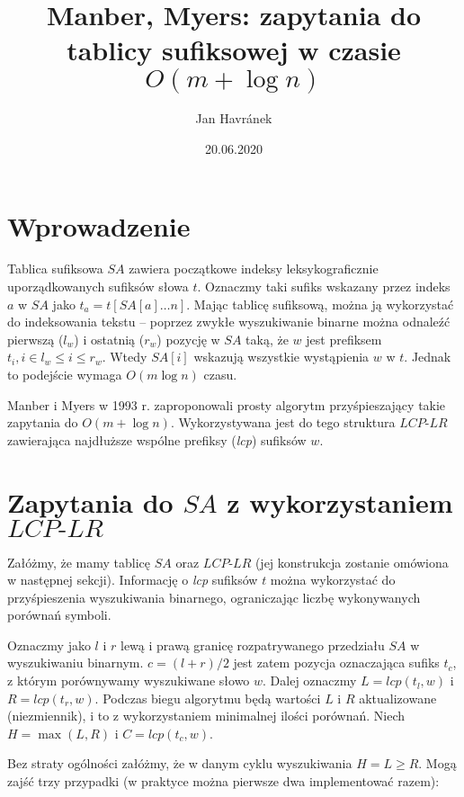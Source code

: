 \documentclass[12pt]{article}
\title{Manber, Myers: zapytania do tablicy sufiksowej w czasie $O(m + \log{n})$}
\author{Jan Havránek}
\date{20.06.2020}
\begin{document}
\maketitle

\section*{Wprowadzenie}
Tablica sufiksowa $SA$ zawiera początkowe indeksy leksykograficznie uporządkowanych sufiksów słowa $t$. Oznaczmy taki sufiks wskazany przez indeks $a$ w $SA$ jako $t_a = t[SA[a]\ldots n]$. Mając tablicę sufiksową, można ją wykorzystać do indeksowania tekstu -- poprzez zwykłe wyszukiwanie binarne można odnaleźć pierwszą ($l_w$) i ostatnią ($r_w$) pozycję w $SA$ taką, że $w$ jest prefiksem $t_i, i \in l_w \leq i \leq r_w$. Wtedy $SA[i]$ wskazują wszystkie wystąpienia $w$ w $t$. Jednak to podejście wymaga $O(m \log{n})$ czasu.

Manber i Myers w 1993 r. zaproponowali prosty algorytm przyśpieszający takie zapytania do $O(m + \log{n})$. Wykorzystywana jest do tego struktura $LCP\textrm{-}LR$ zawierająca najdłuższe wspólne prefiksy (\textit{lcp}) sufiksów $w$. 

\section*{Zapytania do $SA$ z wykorzystaniem $LCP\textrm{-}LR$}

Załóżmy, że mamy tablicę $SA$ oraz $LCP\textrm{-}LR$ (jej konstrukcja zostanie omówiona w następnej sekcji). Informację o \textit{lcp} sufiksów $t$ można wykorzystać do przyśpieszenia wyszukiwania binarnego, ograniczając liczbę wykonywanych porównań symboli. 

Oznaczmy jako $l$ i $r$ lewą i prawą granicę rozpatrywanego przedziału $SA$ w wyszukiwaniu binarnym. $c = (l + r) / 2 $ jest zatem pozycja oznaczająca sufiks $t_c$, z którym porównywamy wyszukiwane słowo $w$. Dalej oznaczmy $L = lcp(t_l, w)$ i $R = lcp(t_r, w)$. Podczas biegu algorytmu będą wartości $L$ i $R$ aktualizowane (niezmiennik), i to z wykorzystaniem minimalnej ilości porównań. Niech $H = \max (L, R)$ i $C = lcp(t_c, w)$. 

Bez straty ogólności załóżmy, że w danym cyklu wyszukiwania $H = L \geq R$. Mogą zajść trzy przypadki (w praktyce można pierwsze dwa implementować razem):
\end{document}
